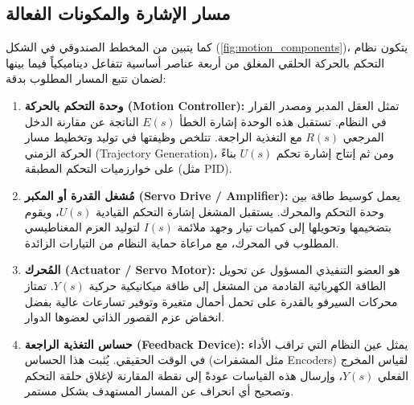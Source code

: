 \subsection{مسار الإشارة والمكونات الفعالة}
كما يتبين من المخطط الصندوقي في الشكل (\ref{fig:motion_components})، يتكون نظام التحكم بالحركة الحلقي المغلق من أربعة عناصر أساسية تتفاعل ديناميكياً فيما بينها لضمان تتبع المسار المطلوب بدقة:

\begin{enumerate}
    \item \textbf{وحدة التحكم بالحركة (\textenglish{Motion Controller}):}
    تمثل العقل المدبر ومصدر القرار في النظام. تستقبل هذه الوحدة إشارة الخطأ $E(s)$ الناتجة عن مقارنة الدخل المرجعي $R(s)$ مع التغذية الراجعة. تتلخص وظيفتها في توليد وتخطيط مسار الحركة الزمني (\textenglish{Trajectory Generation})، ومن ثم إنتاج إشارة تحكم $U(s)$ بناءً على خوارزميات التحكم المطبقة (مثل \textenglish{PID}).
    
    \item \textbf{مُشغل القدرة أو المكبر (\textenglish{Servo Drive / Amplifier}):}
    يعمل كوسيط طاقة بين وحدة التحكم والمحرك. يستقبل المشغل إشارة التحكم القيادية $U(s)$، ويقوم بتضخيمها وتحويلها إلى كميات تيار وجهد ملائمة $I(s)$ لتوليد العزم المغناطيسي المطلوب في المحرك، مع مراعاة حماية النظام من التيارات الزائدة.
    
    \item \textbf{المُحرك (\textenglish{Actuator / Servo Motor}):}
    هو العضو التنفيذي المسؤول عن تحويل الطاقة الكهربائية القادمة من المشغل إلى طاقة ميكانيكية حركية $Y(s)$. تمتاز محركات السيرفو بالقدرة على تحمل أحمال متغيرة وتوفير تسارعات عالية بفضل انخفاض عزم القصور الذاتي لعضوها الدوار.
    
    \item \textbf{حساس التغذية الراجعة (\textenglish{Feedback Device}):}
    يمثل عين النظام التي تراقب الأداء في الوقت الحقيقي. يُثبت هذا الحساس (مثل المشفرات \textenglish{Encoders}) لقياس المخرج الفعلي $Y(s)$، وإرسال هذه القياسات عودةً إلى نقطة المقارنة لإغلاق حلقة التحكم وتصحيح أي انحراف عن المسار المستهدف بشكل مستمر.
\end{enumerate}